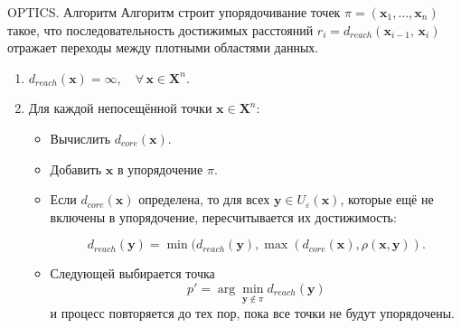 \documentclass[unicode, notheorems, handout]{beamer}
\begin{document}
\begin{frame}{OPTICS. Алгоритм}
\small 
Алгоритм строит упорядочивание точек $\pi = (\pmb{x}_1, \dots, \pmb{x}_n)$ такое, что последовательность достижимых расстояний $r_i = d_{reach} (\pmb{x}_{i-1}, \, \pmb{x}_i)$ отражает переходы между плотными областями данных.

\begin{enumerate}
    \item $d_{reach} (\pmb{x} )=\infty,\quad \forall \,\pmb{x} \in \pmb{X}^n.$
    \item Для каждой непосещённой точки $\pmb{x} \in \pmb{X}^n$: 
       \begin{itemize}
           \item Вычислить $d_{core}(\pmb{x})$. 
           
           \item  Добавить $\pmb{x}$ в упорядочение $\pi$. 
           
           \item  Если $d_{core}(\pmb{x})$ определена, то для всех $\pmb{y} \in U_\varepsilon (\pmb{x})$, которые ещё не включены в упорядочение, пересчитывается их достижимость:
           \vspace{-1.5ex}
           
           $$d_{reach}(\pmb{y}) = \min (d_{reach}(\pmb{y}) , \max (d_{core}(\pmb{x}), \rho(\pmb{x}, \pmb{y})).$$
           \vspace{-1ex}

           \item Следующей выбирается точка 
           $$ p' = \arg\min_{\pmb{y} \notin \pi} d_{reach}(\pmb{y}) $$
            и процесс повторяется до тех пор, пока все точки не будут упорядочены.
       \end{itemize}
\end{enumerate}
\end{frame}
\end{document}
